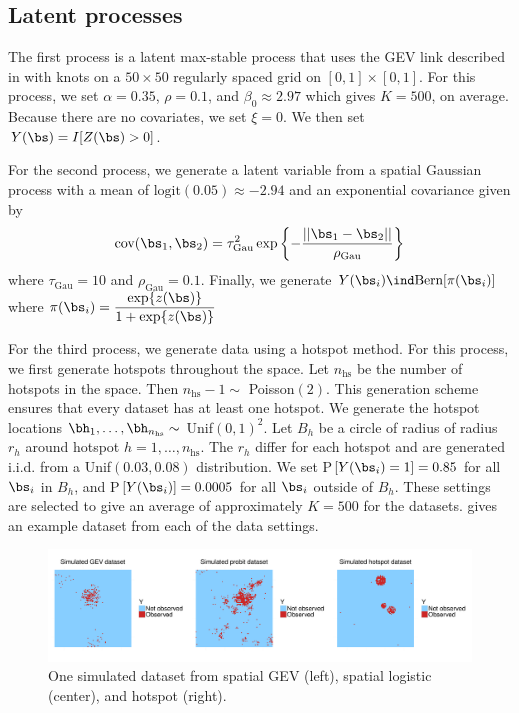 \subsection{Latent processes} \label{rbs:simsettings}
The first process is a latent max-stable process that uses the GEV link described in  with knots on a $50 \times 50$ regularly spaced grid on $[0, 1] \times [0, 1]$.
For this process, we set $\alpha = 0.35$, $\rho = 0.1$, and $\beta_0 \approx 2.97$ which gives $K = 500$, on average.
Because there are no covariates, we set $\xi = 0$.
We then set $Y(\bs) = I[Z(\bs) > 0]$.

For the second process, we generate a latent variable from a spatial Gaussian process with a mean of $\text{logit}(0.05) \approx -2.94$ and an exponential covariance given by
\begin{align}
  \text{cov}(\bs_1, \bs_2) = \tau_\text{Gau}^2 \exp\left\{- \frac{||\bs_1 - \bs_2||}{\rho_\text{Gau}}\right\}
\end{align}
where $\tau_\text{Gau} = 10$ and $\rho_\text{Gau} = 0.1$.
Finally, we generate $Y(\bs_i) \ind \text{Bern}[\pi(\bs_i)]$
where $\pi(\bs_i) = \displaystyle \frac{ \exp\{z(\bs)\}}{1 + \exp\{z(\bs)\} }$

For the third process, we generate data using a hotspot method.
For this process, we first generate hotspots throughout the space.
Let $n_\text{hs}$ be the number of hotspots in the space.
Then $n_\text{hs} - 1 \sim$ Poisson$(2)$.
This generation scheme ensures that every dataset has at least one hotspot.
We generate the hotspot locations $\bh_1, \ldots, \bh_{n_\text{hs}} \sim$ Unif$(0, 1)^2$.
Let $B_h$ be a circle of radius of radius $r_h$ around hotspot $h = 1, \ldots, n_\text{hs}$.
The $r_h$ differ for each hotspot and are generated i.i.d. from a Unif$(0.03, 0.08)$ distribution.
We set P$[Y(\bs_i) = 1] = 0.85$ for all $\bs_i$ in $B_h$, and P$[Y(\bs_i)] = 0.0005$ for all $\bs_i$ outside of $B_h$.
These settings are selected to give an average of approximately $K = 500$ for the datasets.
 gives an example dataset from each of the data settings.

\begin{figure}
  \centering
  \includegraphics[width=\linewidth, trim=0 1in 0 1in]{plots/simulateddata}
  \caption{One simulated dataset from spatial GEV (left), spatial logistic (center), and hotspot (right).}
  \label{rbfig:simulateddata}
\end{figure}

